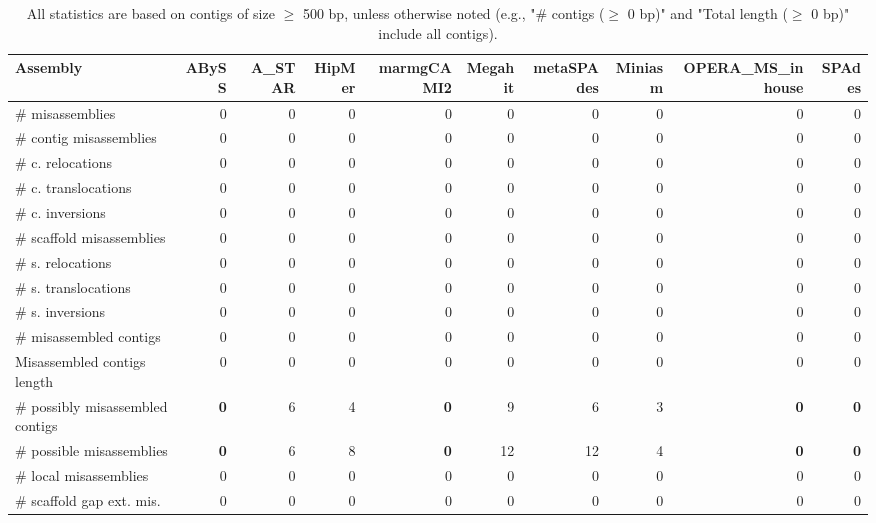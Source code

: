 \documentclass[12pt,a4paper]{article}
\begin{document}
\begin{table}[ht]
\begin{center}
\caption{All statistics are based on contigs of size $\geq$ 500 bp, unless otherwise noted (e.g., "\# contigs ($\geq$ 0 bp)" and "Total length ($\geq$ 0 bp)" include all contigs).}
\begin{tabular}{|l*{9}{|r}|}
\hline
Assembly & ABySS & A\_STAR & HipMer & marmgCAMI2 & Megahit & metaSPAdes & Miniasm & OPERA\_MS\_inhouse & SPAdes \\ \hline
\# misassemblies & 0 & 0 & 0 & 0 & 0 & 0 & 0 & 0 & 0 \\ \hline
\hspace{2mm}\# contig misassemblies & 0 & 0 & 0 & 0 & 0 & 0 & 0 & 0 & 0 \\ \hline
\hspace{5mm}\# c. relocations & 0 & 0 & 0 & 0 & 0 & 0 & 0 & 0 & 0 \\ \hline
\hspace{5mm}\# c. translocations & 0 & 0 & 0 & 0 & 0 & 0 & 0 & 0 & 0 \\ \hline
\hspace{5mm}\# c. inversions & 0 & 0 & 0 & 0 & 0 & 0 & 0 & 0 & 0 \\ \hline
\hspace{2mm}\# scaffold misassemblies & 0 & 0 & 0 & 0 & 0 & 0 & 0 & 0 & 0 \\ \hline
\hspace{5mm}\# s. relocations & 0 & 0 & 0 & 0 & 0 & 0 & 0 & 0 & 0 \\ \hline
\hspace{5mm}\# s. translocations & 0 & 0 & 0 & 0 & 0 & 0 & 0 & 0 & 0 \\ \hline
\hspace{5mm}\# s. inversions & 0 & 0 & 0 & 0 & 0 & 0 & 0 & 0 & 0 \\ \hline
\# misassembled contigs & 0 & 0 & 0 & 0 & 0 & 0 & 0 & 0 & 0 \\ \hline
Misassembled contigs length & 0 & 0 & 0 & 0 & 0 & 0 & 0 & 0 & 0 \\ \hline
\# possibly misassembled contigs & {\bf 0} & 6 & 4 & {\bf 0} & 9 & 6 & 3 & {\bf 0} & {\bf 0} \\ \hline
\hspace{5mm}\# possible misassemblies & {\bf 0} & 6 & 8 & {\bf 0} & 12 & 12 & 4 & {\bf 0} & {\bf 0} \\ \hline
\# local misassemblies & 0 & 0 & 0 & 0 & 0 & 0 & 0 & 0 & 0 \\ \hline
\# scaffold gap ext. mis. & 0 & 0 & 0 & 0 & 0 & 0 & 0 & 0 & 0 \\ \hline

\end{tabular}
\end{center}
\end{table}
\end{document}
